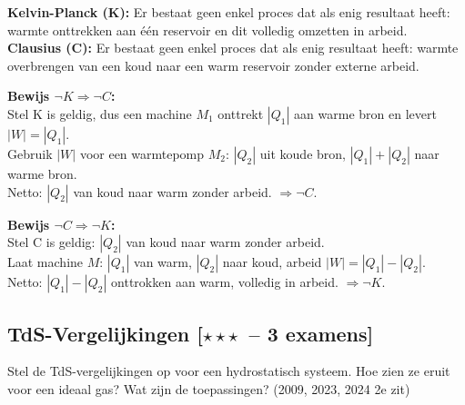 \documentclass[10pt,a4paper]{article}
\begin{document}
\begin{oplossing}
\textbf{Kelvin-Planck (K):} Er bestaat geen enkel proces dat als enig resultaat heeft: warmte onttrekken aan één reservoir en dit volledig omzetten in arbeid.\\
\textbf{Clausius (C):} Er bestaat geen enkel proces dat als enig resultaat heeft: warmte overbrengen van een koud naar een warm reservoir zonder externe arbeid.

\textbf{Bewijs $\neg K \Rightarrow \neg C$:}\\
Stel K is geldig, dus een machine $M_1$ onttrekt $|Q_1|$ aan warme bron en levert $|W| = |Q_1|$.\\
Gebruik $|W|$ voor een warmtepomp $M_2$: $|Q_2|$ uit koude bron, $|Q_1|+|Q_2|$ naar warme bron.\\
Netto: $|Q_2|$ van koud naar warm zonder arbeid. $\Rightarrow \neg C$. \checkmark

\textbf{Bewijs $\neg C \Rightarrow \neg K$:}\\
Stel C is geldig: $|Q_2|$ van koud naar warm zonder arbeid.\\
Laat machine $M$: $|Q_1|$ van warm, $|Q_2|$ naar koud, arbeid $|W| = |Q_1|-|Q_2|$.\\
Netto: $|Q_1|-|Q_2|$ onttrokken aan warm, volledig in arbeid. $\Rightarrow \neg K$. \checkmark
\end{oplossing}

\subsection{TdS-Vergelijkingen \textnormal{\color{warningred}[$\star\star\star$\ -- 3 examens]}}

\begin{theorievraag}{Stel de TdS-vergelijkingen op voor een hydrostatisch systeem. Hoe zien ze eruit voor een ideaal gas? Wat zijn de toepassingen? \textnormal{(2009, 2023, 2024 2e zit)}}
\end{theorievraag}
\end{document}
